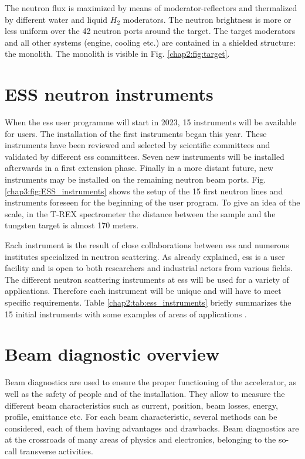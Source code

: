 \begin{refsection}
  The neutron flux is maximized by means of moderator-reflectors and thermalized by different water and liquid $H_{2}$ moderators. The neutron brightness is more or less uniform over the 42 neutron ports around the target. The target moderators and all other systems (engine, cooling etc.) are contained in a shielded structure: the monolith. The monolith is visible in Fig. \ref{chap2:fig:target}.

  

  \section{ESS neutron instruments}

  When the \acrshort{ess} user programme will start in 2023, 15 instruments will be available for users. The installation of the first instruments began this year. These instruments have been reviewed and selected by scientific committees and validated by different \acrshort{ess} committees. Seven new instruments will be installed afterwards in a first extension phase. Finally in a more distant future, new instruments may be installed on the remaining neutron beam ports. Fig. \ref{chap3:fig:ESS_instruments} shows the setup of the 15 first neutron lines and instruments foreseen for the beginning of the user program. To give an idea of the scale, in the T-REX spectrometer the distance between the sample and the tungsten target is almost 170 meters.

  Each instrument is the result of close collaborations between \acrshort{ess} and numerous institutes specialized in neutron scattering. As already explained, \acrshort{ess} is a user facility and is open to both researchers and industrial actors from various fields. The different neutron scattering instruments at \acrshort{ess} will be used for a variety of applications. Therefore each instrument will be unique and will have to meet specific requirements. Table \ref{chap2:tab:ess_instruments} briefly summarizes the 15 initial instruments with some examples of areas of applications \cite{essInstrument,essInstrument2}.

  
  \vspace{1cm}

  

  \FloatBarrier
  \section{Beam diagnostic overview}
  Beam diagnostics are used to ensure the proper functioning of the accelerator, as well as the safety of people and of the installation. They allow to measure the different beam characteristics such as current, position, beam losses, energy, profile, emittance etc. For each beam characteristic, several methods can be considered, each of them having advantages and drawbacks. Beam diagnostics are at the crossroads of many areas of physics and electronics, belonging to the so-call transverse activities.


\end{refsection}
